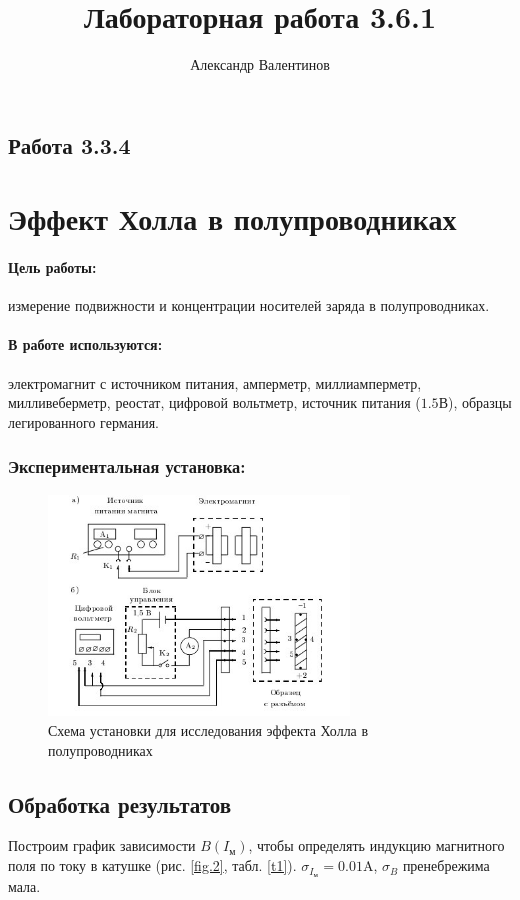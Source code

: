 \documentclass{article}
\author{Александр Валентинов}
\title{Лабораторная работа 3.6.1}
\begin{document}
   \subsection*{Работа 3.3.4}
   \section*{Эффект Холла в полупроводниках}
   
   \paragraph{Цель работы:} измерение подвижности и концентрации носителей заряда в полупроводниках.
   
   \paragraph{В работе используются:} электромагнит с источником питания, амперметр, миллиамперметр, милливеберметр, реостат, цифровой вольтметр, источник питания ($1.5$В), образцы легированного германия.
   
   \subsubsection*{Экспериментальная установка:}
   
   \begin{figure}[h]
   \centering
   \includegraphics[width=8cm]{3_3_4.jpg} 
   \caption{Схема установки для исследования эффекта Холла в полупроводниках} 
   \label{fig.1} 
   \end{figure}

   \subsection*{Обработка результатов}
   Построим график зависимости $B(I_{\text{м}})$, чтобы определять индукцию магнитного поля по току в катушке (рис. \ref{fig.2}, табл. \ref{t1}). $\sigma_{I_{\text{м}}} = 0.01 \text{A}$, $\sigma_B$ пренебрежима мала.
   
\end{document}
